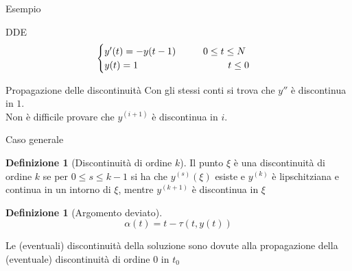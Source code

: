\documentclass[intlimits]{beamer}
\numberwithin{equation}{section}
\theoremstyle{plain}
\theoremstyle{definition}
\newtheorem{defin}[teor]{Definizione}
\theoremstyle{remark}
\begin{document}
\begin{frame}{Esempio}

\begin{block}{DDE}
$$
\begin{cases}
 y'(t)=-y(t-1)	\hspace{1cm}		0 \le 	t \le N			\\
 y(t)=1		\hspace{3.3cm}			t \le 0
\end{cases}
$$
\end{block}
\pause
\begin{block}{Propagazione delle discontinuità}
 Con gli stessi conti si trova che $y''$ è discontinua in $1$.
\\[0.5cm]
Non è difficile provare che $y^{(i+1)}$ è discontinua in $i$.
\end{block}

 
\end{frame}


\begin{frame}{Caso generale}
\pause
\begin{defin}[Discontinuità di ordine $k$]
Il punto $\xi$ è una discontinuità di ordine $k$ se per $0 \le s \le k-1$ si ha che $y^{(s)}(\xi)$ esiste e $y^{(k)}$ è lipschitziana 
e continua in un intorno di $\xi$, mentre $y^{(k+1)}$ è discontinua in $\xi$ 
\end{defin}

\pause

\begin{defin}[Argomento deviato]
$$
\alpha(t)=t-\tau(t,y(t))
$$ 
\end{defin}

\pause
\begin{block}{}
 Le (eventuali) discontinuità della soluzione sono dovute alla propagazione della (eventuale) discontinuità di ordine $0$ in $t_0$
\end{block}

\end{frame}
\end{document}
